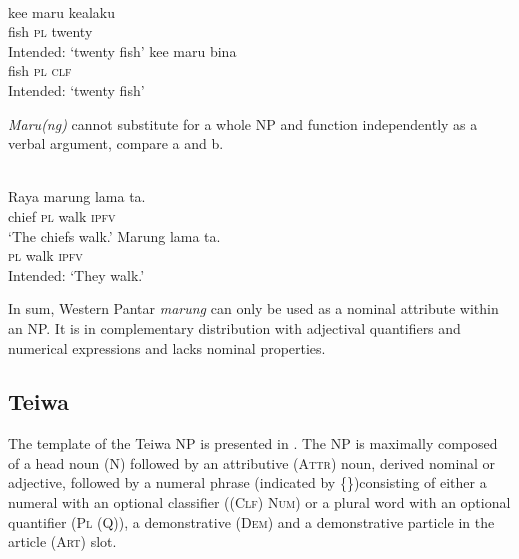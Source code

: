 \ea%
\label{ex:9:18}
 \\
\ea
\gll *ke{\textglotstop}e  maru kealaku \\
   fish  \textsc{pl} twenty \\
\glt Intended: `twenty fish'
\ex 
\gll *ke{\textglotstop}e maru  bina \\
 fish \textsc{pl} \textsc{clf} \\
 \glt Intended: `twenty fish'
\z
\z

\textit{Maru(ng)} cannot substitute for a whole NP and function independently as a verbal argument, compare a and b.


\ea%
\label{ex:9:19}
 \\
\ea
\gll  Raya marung lama ta. \\
   chief \textsc{pl} walk \textsc{ipfv}  \\
\glt `The chiefs walk.'
\ex
\gll *Marung lama ta. \\
  \textsc{pl} walk \textsc{ipfv}  \\
\glt Intended: `They walk.'
\z
\z


 In sum, Western Pantar \textit{marung} can only be used as a nominal attribute within an NP. It is in complementary distribution with adjectival quantifiers and numerical expressions and lacks nominal properties.

\subsection{Teiwa} %
\label{sec:9:3.2}
The template of the Teiwa NP is presented in . The NP is maximally composed of a head noun (N) followed by an attributive (\textsc{Attr)} noun, derived nominal or adjective\textsc{,} followed by a numeral phrase (indicated by \{\})consisting of either a numeral with an optional classifier (\textsc{(Clf)} \textsc{Num)} or a plural word with an optional quantifier (\textsc{Pl} \textsc{(Q)),} a demonstrative \textsc{(Dem)} and a demonstrative particle in the article (\textsc{Art)} slot.



